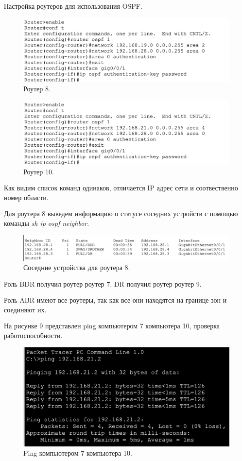 \documentclass[a4paper,14pt]{extreport} %
\begin{document}
\begin{enumerate}
Настройка роутеров для использования OSPF.

\begin{figure}[H]
  \centering
  \includegraphics[scale=0.8]{6}
  \caption{Роутер 8. }
\end{figure}

\begin{figure}[H]
  \centering
  \includegraphics[scale=0.8]{7}
  \caption{Роутер 10. }
\end{figure}

Как видим список команд одинаков, отличается IP адрес сети и соотвественно номер области.

Для роутера 8 выведем информацию о статусе соседних устройств с помощью команды \textit{sh ip ospf neighbor}.

\begin{figure}[H]
  \centering
  \includegraphics[scale=0.65]{8}
  \caption{Соседние устройства для роутера 8. }
\end{figure}

Роль BDR получил роутер роутер 7. DR получил роутер роутер 9.

Роль ABR имеют все роутеры, так как все они находятся на границе зон и соединяют их.

На рисунке 9 представлен ping компьютером 7 компьютера 10, проверка работоспособности.

\begin{figure}[H]
  \centering
  \includegraphics[scale=0.8]{9}
  \caption{Ping компьютером 7 компьютера 10. }
\end{figure}

\end{enumerate}
\end{document}
